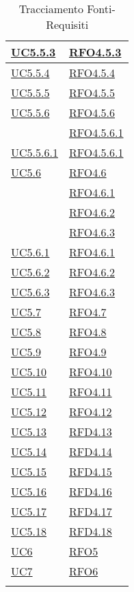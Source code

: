 \begin{longtable}{|>{\centering}m{5cm}|m{5cm}<{\centering}|}
\hyperref[UC5.5.3]{UC5.5.3} & \hyperlink{RFO4.5.3}{RFO4.5.3}\\ \hline
\hyperref[UC5.5.4]{UC5.5.4} & \hyperlink{RFO4.5.4}{RFO4.5.4}\\ \hline
\hyperref[UC5.5.5]{UC5.5.5} & \hyperlink{RFO4.5.5}{RFO4.5.5}\\ \hline
\hyperref[UC5.5.6]{UC5.5.6} & \hyperlink{RFO4.5.6}{RFO4.5.6}\\
& \hyperlink{RFO4.5.6.1}{RFO4.5.6.1}\\ \hline
\hyperref[UC5.5.6.1]{UC5.5.6.1} & \hyperlink{RFO4.5.6.1}{RFO4.5.6.1}\\ \hline
\hyperref[UC5.6]{UC5.6} & \hyperlink{RFO4.6}{RFO4.6}\\
& \hyperlink{RFO4.6.1}{RFO4.6.1}\\
& \hyperlink{RFO4.6.2}{RFO4.6.2}\\
& \hyperlink{RFO4.6.3}{RFO4.6.3}\\ \hline
\hyperref[UC5.6.1]{UC5.6.1} & \hyperlink{RFO4.6.1}{RFO4.6.1}\\ \hline
\hyperref[UC5.6.2]{UC5.6.2} & \hyperlink{RFO4.6.2}{RFO4.6.2}\\ \hline
\hyperref[UC5.6.3]{UC5.6.3} & \hyperlink{RFO4.6.3}{RFO4.6.3}\\ \hline
\hyperref[UC5.7]{UC5.7} & \hyperlink{RFO4.7}{RFO4.7}\\ \hline
\hyperref[UC5.8]{UC5.8} & \hyperlink{RFO4.8}{RFO4.8}\\ \hline
\hyperref[UC5.9]{UC5.9} & \hyperlink{RFO4.9}{RFO4.9}\\ \hline
\hyperref[UC5.10]{UC5.10} & \hyperlink{RFO4.10}{RFO4.10}\\ \hline
\hyperref[UC5.11]{UC5.11} & \hyperlink{RFO4.11}{RFO4.11}\\ \hline
\hyperref[UC5.12]{UC5.12} & \hyperlink{RFO4.12}{RFO4.12}\\ \hline
\hyperref[UC5.13]{UC5.13} & \hyperlink{RFD4.13}{RFD4.13}\\ \hline
\hyperref[UC5.14]{UC5.14} & \hyperlink{RFD4.14}{RFD4.14}\\ \hline
\hyperref[UC5.15]{UC5.15} & \hyperlink{RFD4.15}{RFD4.15}\\ \hline
\hyperref[UC5.16]{UC5.16} & \hyperlink{RFD4.16}{RFD4.16}\\ \hline
\hyperref[UC5.17]{UC5.17} & \hyperlink{RFD4.17}{RFD4.17}\\ \hline
\hyperref[UC5.18]{UC5.18} & \hyperlink{RFD4.18}{RFD4.18}\\ \hline
\hyperref[UC6]{UC6} & \hyperlink{RFO5}{RFO5}\\ \hline
\hyperref[UC7]{UC7} & \hyperlink{RFO6}{RFO6}\\ \hline
\caption[Tracciamento Fonti-Requisiti]{Tracciamento Fonti-Requisiti}
\label{tabella:fonti-requi}
\end{longtable}

\clearpage




